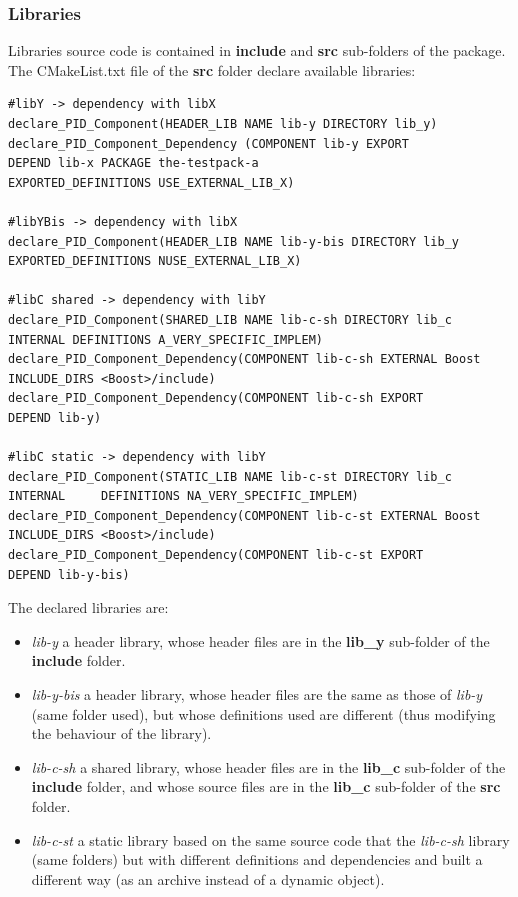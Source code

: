 \documentclass[12pt,a4paper]{article}
\begin{document}
\subsubsection{Libraries}

Libraries source code is contained in \textbf{include} and \textbf{src} sub-folders of the package. The CMakeList.txt file of the \textbf{src} folder declare available libraries:

\begin{verbatim}
#libY -> dependency with libX
declare_PID_Component(HEADER_LIB NAME lib-y DIRECTORY lib_y)
declare_PID_Component_Dependency (COMPONENT lib-y EXPORT 
DEPEND lib-x PACKAGE the-testpack-a
EXPORTED_DEFINITIONS USE_EXTERNAL_LIB_X)

#libYBis -> dependency with libX
declare_PID_Component(HEADER_LIB NAME lib-y-bis DIRECTORY lib_y
EXPORTED_DEFINITIONS NUSE_EXTERNAL_LIB_X)

#libC shared -> dependency with libY
declare_PID_Component(SHARED_LIB NAME lib-c-sh DIRECTORY lib_c
INTERNAL DEFINITIONS A_VERY_SPECIFIC_IMPLEM)
declare_PID_Component_Dependency(COMPONENT lib-c-sh EXTERNAL Boost 
INCLUDE_DIRS <Boost>/include)
declare_PID_Component_Dependency(COMPONENT lib-c-sh EXPORT 
DEPEND lib-y)

#libC static -> dependency with libY
declare_PID_Component(STATIC_LIB NAME lib-c-st DIRECTORY lib_c
INTERNAL	 DEFINITIONS NA_VERY_SPECIFIC_IMPLEM)
declare_PID_Component_Dependency(COMPONENT lib-c-st EXTERNAL Boost 
INCLUDE_DIRS <Boost>/include)
declare_PID_Component_Dependency(COMPONENT lib-c-st EXPORT 
DEPEND lib-y-bis)
\end{verbatim}

The declared libraries are:
\begin{itemize}
\item \textit{lib-y} a header library, whose header files are in the \textbf{lib\_y} sub-folder of the \textbf{include} folder.
\item \textit{lib-y-bis} a header library, whose header files are the same as those of \textit{lib-y} (same folder used), but whose definitions used are different (thus modifying the behaviour of the library).
\item \textit{lib-c-sh} a shared library, whose header files are in the \textbf{lib\_c} sub-folder of the \textbf{include} folder, and whose source files are in the \textbf{lib\_c} sub-folder of the \textbf{src} folder.
\item \textit{lib-c-st} a static library based on the same source code that the \textit{lib-c-sh} library (same folders) but with different definitions and dependencies and built a different way (as an archive instead of a dynamic object).
\end{itemize}
\end{document}
